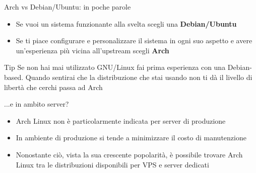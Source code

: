 \begin{frame}{Arch vs Debian/Ubuntu: in poche parole}
    \begin{itemize}
        \item Se vuoi un sistema funzionante alla svelta scegli una \textbf{Debian/Ubuntu}
        \item Se ti piace configurare e personalizzare il sistema in ogni suo aspetto e avere un'esperienza
        più vicina all'upstream scegli \textbf{Arch}
    \end{itemize}

    
    \begin{alertblock}{Tip}
        Se non hai mai utilizzato GNU/Linux fai prima esperienza con una Debian-based. Quando sentirai
        che la distribuzione che stai usando non ti dà il livello di libertà che cerchi passa ad Arch
    \end{alertblock}
\end{frame}

\begin{frame}{...e in ambito server?}
    \begin{itemize}
        \item Arch Linux non è particolarmente indicata per server di produzione
        \item In ambiente di produzione si tende a minimizzare il costo di manutenzione
        \item Nonostante ciò, vista la sua crescente popolarità, è possibile trovare Arch Linux tra le distribuzioni disponibili per VPS e server dedicati
    \end{itemize}
\end{frame}

